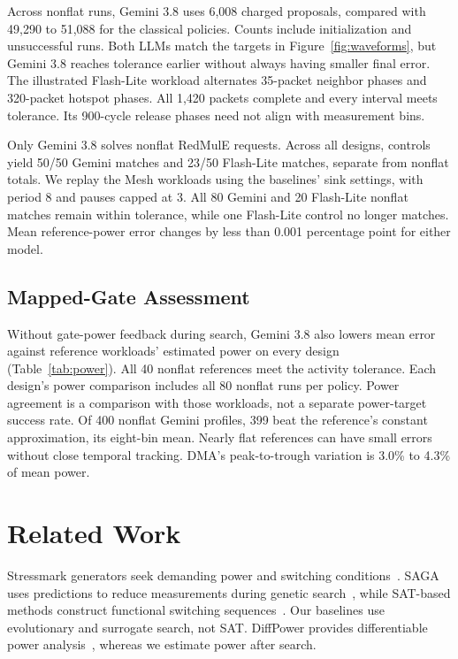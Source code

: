 \documentclass[conference]{IEEEtran}
\begin{document}
Across nonflat runs, Gemini 3.8 uses 6,008 charged proposals, compared with
49,290 to 51,088 for the classical policies. Counts include initialization
and unsuccessful runs. Both LLMs match the targets in Figure~\ref{fig:waveforms},
but Gemini 3.8 reaches tolerance earlier without always having smaller final error.
The illustrated Flash-Lite workload alternates 35-packet neighbor phases and
320-packet hotspot phases. All 1,420 packets complete and every interval meets
tolerance. Its 900-cycle release phases need not align with measurement bins.

Only Gemini 3.8 solves nonflat RedMulE requests. Across all designs, controls
yield 50/50 Gemini matches and 23/50 Flash-Lite matches, separate from nonflat totals.
We replay the Mesh workloads using the baselines' sink settings,
with period 8 and pauses capped at 3. All 80 Gemini and 20 Flash-Lite nonflat
matches remain within tolerance, while one Flash-Lite control no longer matches.
Mean reference-power error changes by less than 0.001 percentage point for
either model.

\subsection{Mapped-Gate Assessment}
Without gate-power feedback during search, Gemini 3.8 also lowers mean
error against reference workloads' estimated power on every design
(Table~\ref{tab:power}). All 40 nonflat references meet the activity tolerance.
Each design's power comparison includes all 80 nonflat runs per policy.
Power agreement is a comparison with those workloads,
not a separate power-target success rate.
Of 400 nonflat Gemini profiles, 399 beat the reference's constant approximation,
its eight-bin mean. Nearly flat references can have small errors without close
temporal tracking. DMA's peak-to-trough variation is 3.0\% to 4.3\% of mean power.

\begin{table}[t]
\centering\small
\caption{Mean error against the reference workload's estimated power profile
(NRMSE, \% of reference mean). Classical selects Phase-model for AES/DMA and
Phase-GA otherwise by lowest mean error. Columns share $n$ measured pairs.}
\label{tab:power}
\vspace{-2pt}

\vspace{-5pt}
\end{table}

\section{Related Work}
Stressmark generators seek demanding power and switching conditions~\cite{stressmark,gest}.
SAGA uses predictions to reduce measurements during genetic search~\cite{saga},
while SAT-based methods construct functional switching sequences~\cite{sat}.
Our baselines use evolutionary and surrogate search, not SAT. DiffPower provides
differentiable power analysis~\cite{diffpower}, whereas we estimate power after search.
\end{document}
